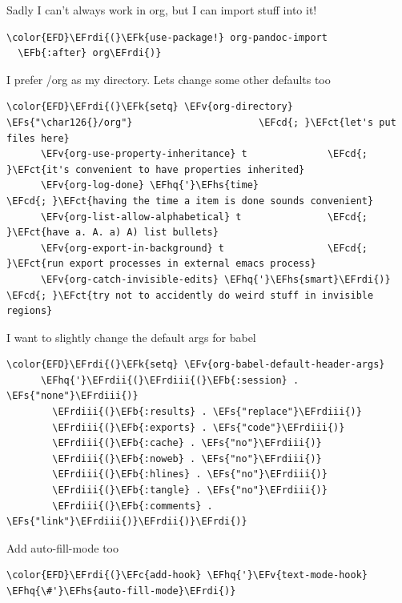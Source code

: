 \documentclass{scrartcl}
\newcommand{\EFk}[1]{\textcolor{EFk}{#1}} %
\newcommand{\EFs}[1]{\textcolor{EFs}{#1}} %
\newcommand{\EFb}[1]{\textcolor{EFb}{#1}} %
\newcommand{\EFct}[1]{\textcolor{EFct}{#1}} %
\newcommand{\EFc}[1]{\textcolor{EFc}{#1}} %
\newcommand{\EFv}[1]{\textcolor{EFv}{#1}} %
\newcommand{\EFcd}[1]{\textcolor{EFcd}{#1}} %
\newcommand{\EFhq}[1]{\textcolor{EFhq}{#1}} %
\newcommand{\EFhs}[1]{\textcolor{EFhs}{#1}} %
\newcommand{\EFrdi}[1]{\textcolor{EFrdi}{#1}} %
\newcommand{\EFrdii}[1]{\textcolor{EFrdii}{#1}} %
\newcommand{\EFrdiii}[1]{\textcolor{EFrdiii}{#1}} %
\begin{document}
Sadly I can't always work in org, but I can import stuff into it!
\begin{Code}
\begin{Verbatim}[]
\color{EFD}\EFrdi{(}\EFk{use-package!} org-pandoc-import
  \EFb{:after} org\EFrdi{)}
\end{Verbatim}
\end{Code}

I prefer /org as my directory. Lets change some other defaults too
\begin{Code}
\begin{Verbatim}[]
\color{EFD}\EFrdi{(}\EFk{setq} \EFv{org-directory} \EFs{"\char126{}/org"}                      \EFcd{; }\EFct{let's put files here}
      \EFv{org-use-property-inheritance} t              \EFcd{; }\EFct{it's convenient to have properties inherited}
      \EFv{org-log-done} \EFhq{'}\EFhs{time}                          \EFcd{; }\EFct{having the time a item is done sounds convenient}
      \EFv{org-list-allow-alphabetical} t               \EFcd{; }\EFct{have a. A. a) A) list bullets}
      \EFv{org-export-in-background} t                  \EFcd{; }\EFct{run export processes in external emacs process}
      \EFv{org-catch-invisible-edits} \EFhq{'}\EFhs{smart}\EFrdi{)}            \EFcd{; }\EFct{try not to accidently do weird stuff in invisible regions}
\end{Verbatim}
\end{Code}

I want to slightly change the default args for babel
\begin{Code}
\begin{Verbatim}[]
\color{EFD}\EFrdi{(}\EFk{setq} \EFv{org-babel-default-header-args}
      \EFhq{'}\EFrdii{(}\EFrdiii{(}\EFb{:session} . \EFs{"none"}\EFrdiii{)}
        \EFrdiii{(}\EFb{:results} . \EFs{"replace"}\EFrdiii{)}
        \EFrdiii{(}\EFb{:exports} . \EFs{"code"}\EFrdiii{)}
        \EFrdiii{(}\EFb{:cache} . \EFs{"no"}\EFrdiii{)}
        \EFrdiii{(}\EFb{:noweb} . \EFs{"no"}\EFrdiii{)}
        \EFrdiii{(}\EFb{:hlines} . \EFs{"no"}\EFrdiii{)}
        \EFrdiii{(}\EFb{:tangle} . \EFs{"no"}\EFrdiii{)}
        \EFrdiii{(}\EFb{:comments} . \EFs{"link"}\EFrdiii{)}\EFrdii{)}\EFrdi{)}
\end{Verbatim}
\end{Code}

Add auto-fill-mode too
\begin{Code}
\begin{Verbatim}[]
\color{EFD}\EFrdi{(}\EFc{add-hook} \EFhq{'}\EFv{text-mode-hook} \EFhq{\#'}\EFhs{auto-fill-mode}\EFrdi{)}
\end{Verbatim}
\end{Code}
\end{document}
